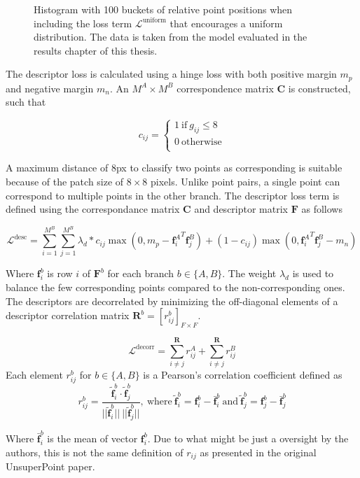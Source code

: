 \begin{figure}[H]
	\begin{center}
		
	\end{center}
	\caption{Histogram with 100 buckets of relative point positions when including the loss term $\mathcal{L}^{\textrm{uniform}}$ that encourages a uniform distribution. The data is taken from the model evaluated in the results chapter of this thesis.}
	\label{fig:hist-unixy}
\end{figure}

The descriptor loss is calculated using a hinge loss with both positive margin $m_p$ and negative margin $m_n$. An $M^A\times M^B$ correspondence matrix $\textbf{C}$ is constructed, such that

\begin{equation}
c_{ij}=
\begin{cases}
1\ \text{if}\ g_{ij}\le 8 \\
0\ \text{otherwise} \\
\end{cases}
\end{equation}

A maximum distance of 8px to classify two points as corresponding is suitable because of the patch size of $8\times 8$ pixels. Unlike point pairs, a single point can correspond to multiple points in the other branch. The descriptor loss term is defined using the correspondance matrix $\textbf{C}$ and descriptor matrix $\textbf{F}$ as follows

\begin{equation}
\mathcal{L}^{\textrm{desc}}=\sum^{M^B}_{i=1}\sum^{M^B}_{j=1}\lambda_d*c_{ij}\max\left(0,m_p-{\textbf{f}_i^A}^T\textbf{f}_j^B\right)+(1-c_{ij})\max\left(0,{\textbf{f}_i^A}^T\textbf{f}_j^B-m_n\right)
\end{equation}

Where $\textbf{f}^b_i$ is row $i$ of $\textbf{F}^b$ for each branch $b\in\{A,B\}$. The weight $\lambda_d$ is used to balance the few corresponding points compared to the non-corresponding ones. The descriptors are decorrelated by minimizing the off-diagonal elements of a descriptor correlation matrix $\textbf{R}^b=[r^b_{ij}]_{F\times F}$.

\begin{equation}
\mathcal{L}^{\textrm{decorr}}=\sum^{\textbf{R}}_{i\neq j}r_{ij}^A+\sum^{\textbf{R}}_{i\neq j}r_{ij}^B
\end{equation}
Each element $r^b_{ij}$ for $b\in\{A,B\}$ is a Pearson's correlation coefficient\cite{pearsons} defined as
\begin{equation}
r^b_{ij}=
\frac{ \tilde{\textbf{f}}_i^b \cdot \tilde{\textbf{f}}_j^b }{
||\tilde{\textbf{f}}_i^b||\ ||\tilde{\textbf{f}}_j^b||
}
,\ \text{where}\ 
\tilde{\textbf{f}}_i^b=\textbf{f}_i^b-\bar{\textbf{f}}^b_i
\ \text{and}\ 
\tilde{\textbf{f}}_j^b=\textbf{f}_j^b-\bar{\textbf{f}}^b_j
\end{equation}

Where $\bar{\textbf{f}}^b_i$ is the mean of vector $\textbf{f}^b_i$. Due to what might be just a oversight by the authors, this is not the same definition of $r_{ij}$ as presented in the original UnsuperPoint paper.